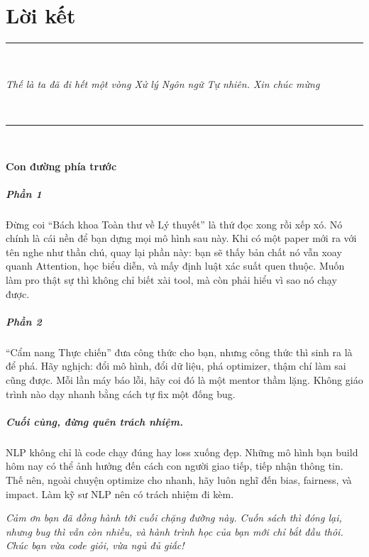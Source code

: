 \chapter*{Lời kết}

\begin{center}
    \vspace*{4cm}
    \rule{0.8\textwidth}{0.4pt} \\[0.8cm]
    \parbox{0.9\textwidth}{
        \centering
        \textit{
        Thế là ta đã đi hết một vòng  Xử lý Ngôn ngữ Tự nhiên. Xin chúc mừng
        }
    } \\[1cm]

    \rule{0.8\textwidth}{0.4pt} \\[2cm]
\end{center}

\noindent
\textbf{Con đường phía trước}

\paragraph{Phần 1}  
Đừng coi “Bách khoa Toàn thư về Lý thuyết” là thứ đọc xong rồi xếp xó. Nó chính là cái nền để bạn dựng mọi mô hình sau này. 
Khi có một paper mới ra với tên nghe như thần chú, quay lại phần này: bạn sẽ thấy bản chất nó vẫn xoay quanh Attention, 
học biểu diễn, và mấy định luật xác suất quen thuộc. Muốn làm pro thật sự thì không chỉ biết xài tool, mà còn phải hiểu vì sao nó chạy được.  

\paragraph{Phần 2}  
“Cẩm nang Thực chiến” đưa công thức cho bạn, nhưng công thức thì sinh ra là để phá. 
Hãy nghịch: đổi mô hình, đổi dữ liệu, phá optimizer, thậm chí làm sai cũng được.  
Mỗi lần máy báo lỗi, hãy coi đó là một mentor thầm lặng. Không giáo trình nào dạy nhanh bằng cách tự fix một đống bug.

\paragraph{Cuối cùng, đừng quên trách nhiệm.}  
NLP không chỉ là code chạy đúng hay loss xuống đẹp. Những mô hình bạn build hôm nay có thể ảnh hưởng đến cách con người giao tiếp, tiếp nhận thông tin.
Thế nên, ngoài chuyện optimize cho nhanh, hãy luôn nghĩ đến bias, fairness, và impact. Làm kỹ sư NLP nên có trách nhiệm đi kèm.

\vfill

\begin{center}
    \parbox{0.9\textwidth}{
        \centering
        {\itshape
        Cảm ơn bạn đã đồng hành tới cuối chặng đường này.  
        Cuốn sách thì đóng lại, nhưng bug thì vẫn còn nhiều, và hành trình học của bạn mới chỉ bắt đầu thôi.  
        Chúc bạn vừa code giỏi, vừa ngủ đủ giấc!
        }
    }
\end{center}
